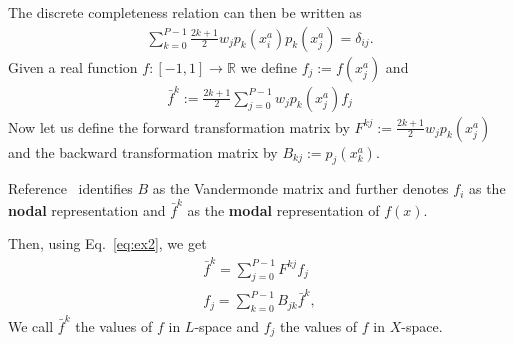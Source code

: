The discrete completeness relation can then be written as
\begin{align}
    \sum_{k=0}^{P-1} \frac{2k+1}{2}w_j p_k(x^a_i)p_k(x^a_j) = \delta_{ij}.
    \label{eq:completeness}
\end{align}
Given a real function $f:[-1,1]\rightarrow \mathbb{R}$ we define $f_j:=f(x^a_j)$ and
\begin{align} \label{eq:ex2}
    \bar f^k := \frac{2k+1}{2}\sum_{j=0}^{P-1}w_j p_k(x^a_j) f_j
\end{align}
Now let us define the forward transformation matrix by $F^{kj}:=\frac{2k+1}{2}w_jp_k(x^a_j)$ and
the backward transformation matrix by $B_{kj}:= p_j(x^a_k)$.
\begin{tcolorbox}[title=Note]
Reference~\cite{NodalDG} identifies $B$ as the Vandermonde matrix and further denotes $f_i$ as the \textbf{nodal} representation and $\bar f^k$ as the \textbf{modal} representation of $f(x)$.
\end{tcolorbox}

Then, using Eq.~\eqref{eq:ex2}, we get
\begin{subequations}
\begin{align}
    \bar f^k = \sum_{j=0}^{P-1}F^{kj}f_j \\
    f_j = \sum_{k=0}^{P-1} B_{jk}\bar f^k,
\end{align}
\end{subequations}
We call $\bar f^k$ the values of $f$ in $L$-space and $f_j$ the values of $f$ in $X$-space.

